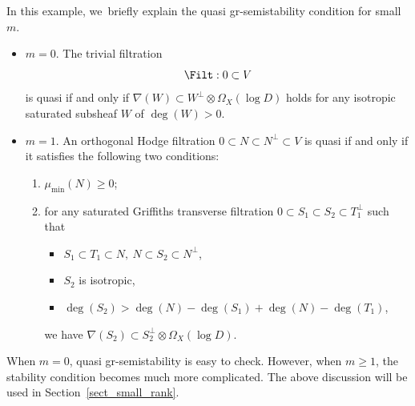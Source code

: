 \begin{examp}\label{smallm}
In this example, we~briefly explain the quasi gr-semistability condition for small $m$.

\begin{itemize}
\item $m=0$.
The trivial filtration
\[
\Filt:0\subset V
\]
is quasi \grsemistable if and only if $\nabla(W)\subset W^\perp\otimes\Omega_X(\log D)$ holds for any isotropic saturated subsheaf $W$ of $\deg(W)>0$.

\item $m=1$.
An orthogonal Hodge filtration $0\subset N\subset N^\perp\subset V$ is quasi \grsemistable if and only if it satisfies the following two conditions:
\begin{enumerate}
\item $\mu_{\min}(N)\geq 0$;
\item for any saturated Griffiths transverse filtration $0\!\subset\! S_1\!\subset\! S_2\!\subset\! T_1^\perp$ such that
\begin{itemize}
\item[$\scriptscriptstyle\bullet$] $S_1\subset T_1\subset N,\ N\subset S_2\subset N^\perp $,
\item[$\scriptscriptstyle\bullet$] $S_2$ is isotropic,
\item[$\scriptscriptstyle\bullet$] $\deg(S_2)>\deg(N)-\deg(S_1)+\deg(N)-\deg(T_1)$,
\end{itemize}
we have $\nabla(S_2)\subset S_2^\perp\otimes \Omega_X(\log D)$.
\end{enumerate}
\end{itemize}
When $m=0$, quasi gr-semistability is easy to check. However, when $m \geq 1$, the stability condition becomes much more complicated. The above discussion will be used in Section~\ref{sect_small_rank}.
\end{examp}

